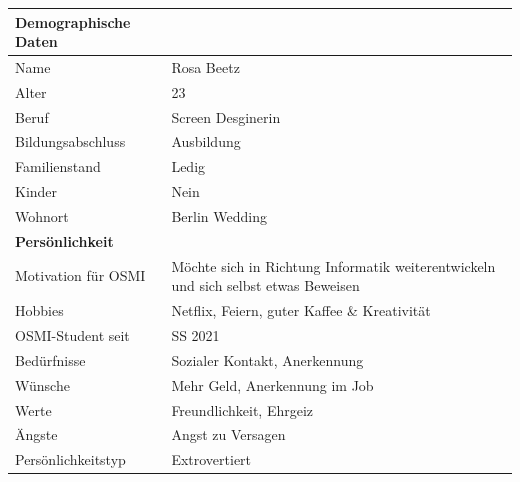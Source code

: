\documentclass{article}
\begin{document}
\begin{center}
	\begin{tabularx}{\textwidth}{|l|X|}
		\hline
		\textbf{Demographische Daten} &                                                     \\
		\hline
		Name                          & Rosa Beetz                                          \\
		\hline
		Alter                         & 23                                                  \\
		\hline
		Beruf                         & Screen Desginerin                                   \\
		\hline
		Bildungsabschluss             & Ausbildung                                          \\
		\hline
		Familienstand                 & Ledig                                               \\
		\hline
		Kinder                        & Nein                                                \\
		\hline
		Wohnort                       & Berlin Wedding                                      \\
		\hline
		\textbf{Persönlichkeit}       &                                                     \\
		\hline
		Motivation für OSMI           & Möchte sich in Richtung Informatik weiterentwickeln
		und sich selbst etwas Beweisen                                                      \\
		\hline
		Hobbies                       & Netflix, Feiern, guter Kaffee \& Kreativität        \\
		\hline
		OSMI-Student seit             & SS 2021                                             \\
		\hline
		Bedürfnisse                   & Sozialer Kontakt, Anerkennung                       \\
		\hline
		Wünsche                       & Mehr Geld, Anerkennung im Job                       \\
		\hline
		Werte                         & Freundlichkeit, Ehrgeiz                             \\
		\hline
		Ängste                        & Angst zu Versagen                                   \\
		\hline
		Persönlichkeitstyp            & Extrovertiert                                       \\
		\hline
	\end{tabularx}
\end{center}
\end{document}
